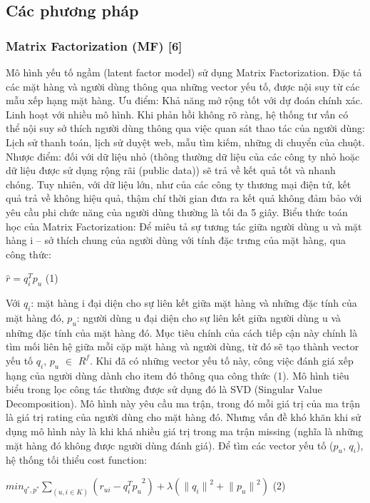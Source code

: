 \documentclass[a4paper,12pt,numbered,print,index,custombib, oneside, custommargin]{report}
\begin{document}
\subsection{Các phương pháp}
\subsubsection{Matrix Factorization (MF) [6]}
Mô hình yếu tố ngầm (latent factor model) sử dụng Matrix Factorization.
Đặc tả các mặt hàng và người dùng thông qua những vector yếu tố, được nội suy từ các mẫu xếp hạng mặt hàng.
Ưu điểm: Khả năng mở rộng tốt với dự đoán chính xác. Linh hoạt với nhiều mô hình.
Khi phản hồi không rõ ràng, hệ thống tư vấn có thể nội suy sở thích người dùng thông qua việc quan sát thao tác của người dùng: Lịch sử thanh toán, lịch sử duyệt web, mẫu tìm kiếm, những di chuyển của chuột.
Nhược điểm: đối với dữ liệu nhỏ (thông thường dữ liệu của các công ty nhỏ hoặc dữ liệu được sử dụng rộng rãi (public data)) sẽ trả về kết quả tốt và nhanh chóng. Tuy nhiên, với dữ liệu lớn, như của các công ty thương mại điện tử, kết quả trả về không hiệu quả, thậm chí thời gian đưa ra kết quả không đảm bảo với yêu cầu phi chức năng của người dùng thường là tối đa 5 giây.
Biểu thức toán học của Matrix Factorization:
Để miêu tả sự tương tác giữa người dùng u và mặt hàng i – sở thích chung của người dùng với tính đặc trưng của mặt hàng, qua công thức:	\par
$\hat{r} = q_i^T p_u$	(1)

Với $q_i$: mặt hàng i đại diện cho sự liên kết giữa mặt hàng và những đặc tính của mặt hàng đó, $p_u$: người dùng u đại diện cho sự liên kết giữa người dùng u và những đặc tính của mặt hàng đó.
Mục tiêu chính của cách tiếp cận này chính là tìm mối liên hệ giữa mỗi cặp mặt hàng và người dùng, từ đó sẽ tạo thành vector yếu tố $q_i$, $p_u$ $\in$ $R^f$. Khi đã có những vector yếu tố này, công việc đánh giá xếp hạng của người dùng dành cho item đó thông qua công thức (1).
Mô hình tiêu biểu trong lọc công tác thường được sử dụng đó là SVD (Singular Value Decomposition). Mô hình này yêu cầu ma trận, trong đó mỗi giá trị của ma trận là giá trị rating của người dùng cho mặt hàng đó. Nhưng vấn đề khó khăn khi sử dụng mô hình này là khi khá nhiều giá trị trong ma trận missing (nghĩa là những mặt hàng đó không được người dùng đánh giá).  
Để tìm các vector yếu tố ($p_u$, $q_i$), hệ thống tối thiểu cost function:		\par

$min_{q^*, p^*} \sum_{(u,i \in K)} ({r_{ui} - q_i^T p_u}^2) + \lambda ({{\parallel q_i \parallel}^2 + {\parallel p_u \parallel}^2}) $  (2)\par
\end{document}

